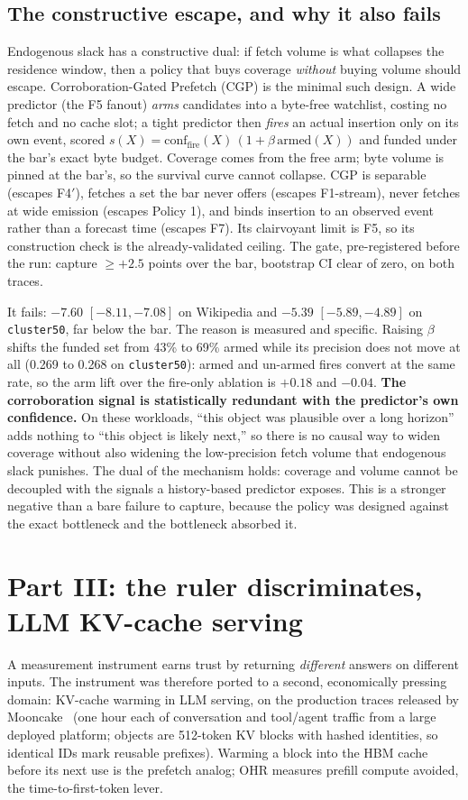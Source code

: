 \documentclass[11pt]{article}
\begin{document}
\subsection{The constructive escape, and why it also fails}\label{sec:cgp}
Endogenous slack has a constructive dual: if fetch volume is what collapses the residence window, then a policy that buys coverage \emph{without} buying volume should escape. Corroboration-Gated Prefetch (CGP) is the minimal such design. A wide predictor (the F5 fanout) \emph{arms} candidates into a byte-free watchlist, costing no fetch and no cache slot; a tight predictor then \emph{fires} an actual insertion only on its own event, scored $s(X){=}\mathrm{conf}_{\mathrm{fire}}(X)\,(1{+}\beta\,\mathrm{armed}(X))$ and funded under the bar's exact byte budget. Coverage comes from the free arm; byte volume is pinned at the bar's, so the survival curve cannot collapse. CGP is separable (escapes F4$'$), fetches a set the bar never offers (escapes F1-stream), never fetches at wide emission (escapes Policy 1), and binds insertion to an observed event rather than a forecast time (escapes F7). Its clairvoyant limit is F5, so its construction check is the already-validated ceiling. The gate, pre-registered before the run: capture $\geq{+}2.5$ points over the bar, bootstrap CI clear of zero, on both traces.

It fails: $-7.60$ $[-8.11,-7.08]$ on Wikipedia and $-5.39$ $[-5.89,-4.89]$ on \texttt{cluster50}, far below the bar. The reason is measured and specific. Raising $\beta$ shifts the funded set from 43\% to 69\% armed while its precision does not move at all (0.269 to 0.268 on \texttt{cluster50}): armed and un-armed fires convert at the same rate, so the arm lift over the fire-only ablation is $+0.18$ and $-0.04$. \textbf{The corroboration signal is statistically redundant with the predictor's own confidence.} On these workloads, ``this object was plausible over a long horizon'' adds nothing to ``this object is likely next,'' so there is no causal way to widen coverage without also widening the low-precision fetch volume that endogenous slack punishes. The dual of the mechanism holds: coverage and volume cannot be decoupled with the signals a history-based predictor exposes. This is a stronger negative than a bare failure to capture, because the policy was designed against the exact bottleneck and the bottleneck absorbed it.

\section{Part III: the ruler discriminates, LLM KV-cache serving}\label{sec:llm}
A measurement instrument earns trust by returning \emph{different} answers on different inputs. The instrument was therefore ported to a second, economically pressing domain: KV-cache warming in LLM serving, on the production traces released by Mooncake~\cite{mooncake} (one hour each of conversation and tool/agent traffic from a large deployed platform; objects are 512-token KV blocks with hashed identities, so identical IDs mark reusable prefixes). Warming a block into the HBM cache before its next use is the prefetch analog; OHR measures prefill compute avoided, the time-to-first-token lever.
\end{document}
